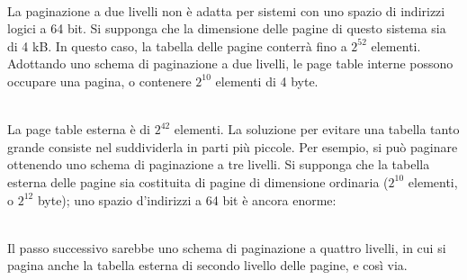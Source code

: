 \documentclass{article}
\begin{document}
				\\La paginazione a due livelli non è adatta per sistemi con uno spazio di indirizzi logici a 64 bit. Si supponga che la dimensione delle pagine di questo sistema sia di 4 kB. In questo caso, la tabella delle pagine conterrà fino a $2^{52}$ elementi. Adottando uno schema di paginazione a due livelli, le page table interne possono occupare una pagina, o contenere $2^{10}$ elementi di 4 byte. 
				\begin{figure}[ht!]
				\end{figure}
				\\La page table esterna è di $2^{42}$ elementi. La soluzione per evitare una tabella tanto grande consiste nel suddividerla in parti più piccole. Per esempio, si può paginare ottenendo uno schema di paginazione a tre livelli. Si supponga che la tabella esterna delle pagine sia costituita di pagine di dimensione ordinaria ($2^{10}$ elementi, o $2^{12}$ byte); uno spazio d’indirizzi a 64 bit è ancora enorme:
				\begin{figure}[ht!]
				\end{figure}
				\\Il passo successivo sarebbe uno schema di paginazione a quattro livelli, in cui si pagina anche la tabella esterna di secondo livello delle pagine, e così via.
\end{document}
